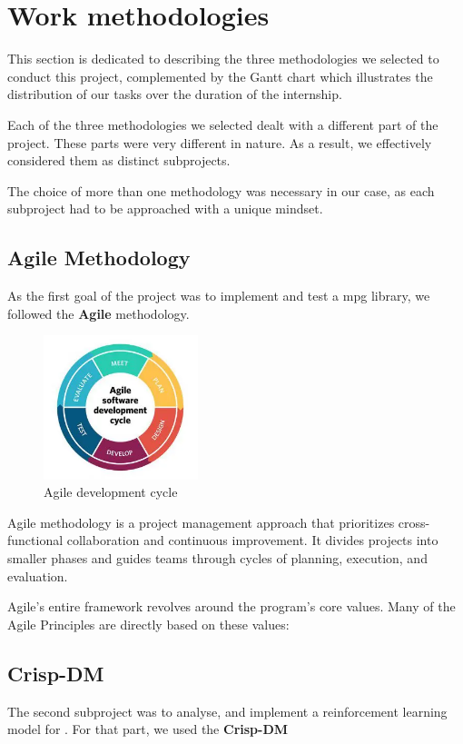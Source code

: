 \section{Work methodologies}
This section is dedicated to describing the three methodologies we selected to conduct this
project, complemented by the Gantt chart which illustrates the distribution of our tasks
over the duration of the internship.

Each of the three methodologies we selected dealt with a different part of the project. These parts were very different in nature. As a result, we effectively considered them as distinct subprojects.

The choice of more than one methodology was necessary in our case, as each subproject had to be approached with a unique mindset.

\subsection{Agile Methodology}
As the first goal of the project was to implement and test a \acrshort{mpg} library, we followed the \textbf{Agile} methodology.

\begin{figure}[h]
	\centering
	\includegraphics[width=0.4\textwidth]{Figures/Agile.png}
	\caption{Agile development cycle}
\end{figure}
\FloatBarrier

Agile methodology is a project management approach that prioritizes cross-functional collaboration and continuous improvement. It divides projects into smaller phases and guides teams through cycles of planning, execution, and evaluation.

Agile’s entire framework revolves around the program’s core values. Many of the Agile Principles are directly based on these values:
\subsection{Crisp-DM}
The second subproject was to analyse, and implement a reinforcement learning model for . For that part, we used the \textbf{Crisp-DM}

